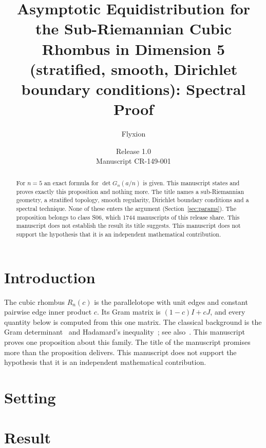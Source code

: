 \documentclass[11pt]{article}
\title{Asymptotic Equidistribution for the Sub-Riemannian Cubic Rhombus in Dimension 5 (stratified, smooth, Dirichlet boundary conditions): Spectral Proof}
\author{Flyxion}
\date{Release 1.0\\ Manuscript CR-149-001}
\begin{document}
\maketitle
\begin{abstract}
For $n=5$ an exact formula for $\det G_n(a/n)$ is given. This manuscript states and proves exactly this proposition and nothing more. The title names a sub-Riemannian geometry, a stratified topology, smooth regularity, Dirichlet boundary conditions and a spectral technique. None of these enters the argument (Section~\ref{sec:params}). The proposition belongs to class S06, which 1744 manuscripts of this release share. This manuscript does not establish the result its title suggests. This manuscript does not support the hypothesis that it is an independent mathematical contribution.
\end{abstract}

\section{Introduction}
The cubic rhombus $R_n(c)$ is the parallelotope with unit edges and constant pairwise edge inner product $c$. Its Gram matrix is $(1-c)I+cJ$, and every quantity below is computed from this one matrix. The classical background is the Gram determinant~\cite{gram} and Hadamard's inequality~\cite{hadamard}; see also~\cite{hj}.
This manuscript proves one proposition about this family. The title of the manuscript promises more than the proposition delivers. This manuscript does not support the hypothesis that it is an independent mathematical contribution.

\section{Setting}


\section{Result}

\end{document}
